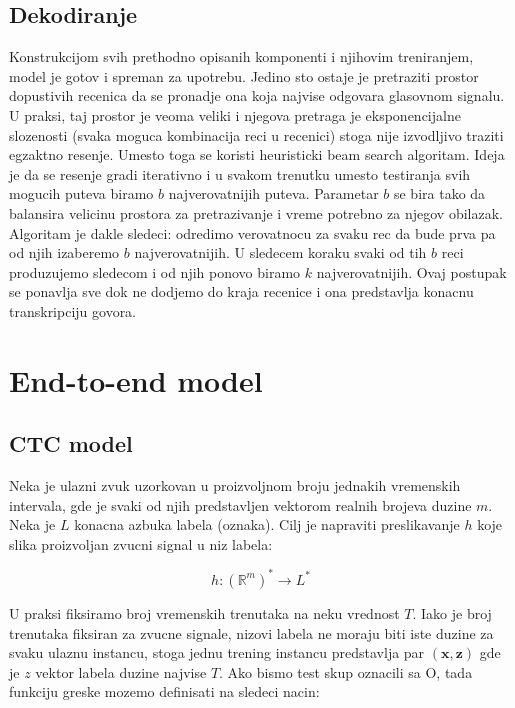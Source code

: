 \documentclass[a4paper]{article}
\begin{document}
\subsection{Dekodiranje}
Konstrukcijom svih prethodno opisanih komponenti i njihovim treniranjem, model je gotov i spreman za upotrebu.
Jedino sto ostaje je pretraziti prostor dopustivih recenica da se pronadje ona koja najvise odgovara glasovnom signalu.
U praksi, taj prostor je veoma veliki i njegova pretraga je eksponencijalne slozenosti (svaka moguca kombinacija reci u recenici) stoga nije izvodljivo traziti egzaktno resenje.
Umesto toga se koristi heuristicki beam search algoritam. Ideja je da se resenje gradi iterativno i u svakom trenutku umesto testiranja svih mogucih puteva biramo $b$ najverovatnijih puteva.
Parametar $b$ se bira tako da balansira velicinu prostora za pretrazivanje i vreme potrebno za njegov obilazak.
Algoritam je dakle sledeci: odredimo verovatnocu za svaku rec da bude prva pa od njih izaberemo $b$ najverovatnijih. U sledecem koraku svaki od tih $b$ reci produzujemo sledecom i od njih ponovo biramo $k$ najverovatnijih.
Ovaj postupak se ponavlja sve dok ne dodjemo do kraja recenice i ona predstavlja konacnu transkripciju govora.

\section{End-to-end model}
\label{sec:e2e}


\subsection{CTC model}

Neka je ulazni zvuk uzorkovan u proizvoljnom broju jednakih vremenskih intervala,  gde je svaki od njih predstavljen vektorom realnih brojeva duzine $m$.  Neka je $L$ konacna azbuka labela (oznaka).  Cilj je napraviti preslikavanje $h$ koje slika proizvoljan zvucni signal u niz labela:

\begin{equation}
\label{eq:pres1}
h: (\mathbb{R}^m)^* \rightarrow L^* 
\end{equation}


U praksi fiksiramo broj vremenskih trenutaka na neku vrednost $T$.  Iako je broj trenutaka fiksiran za zvucne signale,  nizovi labela ne moraju biti iste duzine za svaku ulaznu instancu, stoga jednu trening instancu predstavlja par $(\textbf{x}, \textbf{z})$ gde je $z$ vektor labela duzine najvise $T$.  Ako bismo test skup oznacili sa O, tada funkciju greske mozemo definisati na sledeci nacin:
\end{document}
